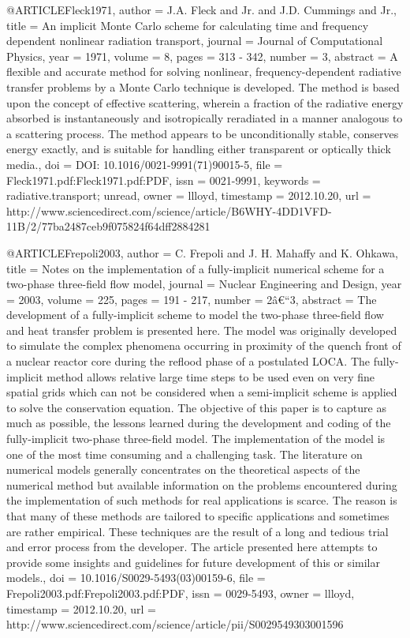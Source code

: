 {@ARTICLE{Fleck1971,
  author = {J.A. Fleck and Jr. and J.D. Cummings and Jr.},
  title = {An implicit Monte Carlo scheme for calculating time and frequency
	dependent nonlinear radiation transport},
  journal = {Journal of Computational Physics},
  year = {1971},
  volume = {8},
  pages = {313 - 342},
  number = {3},
  abstract = {A flexible and accurate method for solving nonlinear, frequency-dependent
	radiative transfer problems by a Monte Carlo technique is developed.
	The method is based upon the concept of effective scattering, wherein
	a fraction of the radiative energy absorbed is instantaneously and
	isotropically reradiated in a manner analogous to a scattering process.
	The method appears to be unconditionally stable, conserves energy
	exactly, and is suitable for handling either transparent or optically
	thick media.},
  doi = {DOI: 10.1016/0021-9991(71)90015-5},
  file = {Fleck1971.pdf:Fleck1971.pdf:PDF},
  issn = {0021-9991},
  keywords = {radiative.transport; unread},
  owner = {llloyd},
  timestamp = {2012.10.20},
  url = {http://www.sciencedirect.com/science/article/B6WHY-4DD1VFD-11B/2/77ba2487ceb9f075824f64dff2884281}
}

@ARTICLE{Frepoli2003,
  author = {C. Frepoli and J. H. Mahaffy and K. Ohkawa},
  title = {Notes on the implementation of a fully-implicit numerical scheme
	for a two-phase three-field flow model},
  journal = {Nuclear Engineering and Design},
  year = {2003},
  volume = {225},
  pages = {191 - 217},
  number = {2â€“3},
  abstract = {The development of a fully-implicit scheme to model the two-phase
	three-field flow and heat transfer problem is presented here. The
	model was originally developed to simulate the complex phenomena
	occurring in proximity of the quench front of a nuclear reactor core
	during the reflood phase of a postulated LOCA. The fully-implicit
	method allows relative large time steps to be used even on very fine
	spatial grids which can not be considered when a semi-implicit scheme
	is applied to solve the conservation equation. The objective of this
	paper is to capture as much as possible, the lessons learned during
	the development and coding of the fully-implicit two-phase three-field
	model. The implementation of the model is one of the most time consuming
	and a challenging task. The literature on numerical models generally
	concentrates on the theoretical aspects of the numerical method but
	available information on the problems encountered during the implementation
	of such methods for real applications is scarce. The reason is that
	many of these methods are tailored to specific applications and sometimes
	are rather empirical. These techniques are the result of a long and
	tedious trial and error process from the developer. The article presented
	here attempts to provide some insights and guidelines for future
	development of this or similar models.},
  doi = {10.1016/S0029-5493(03)00159-6},
  file = {Frepoli2003.pdf:Frepoli2003.pdf:PDF},
  issn = {0029-5493},
  owner = {llloyd},
  timestamp = {2012.10.20},
  url = {http://www.sciencedirect.com/science/article/pii/S0029549303001596}
}

}
